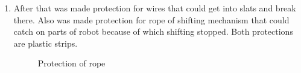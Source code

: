 \begin{enumerate}
  \item After that was made protection for wires that could get into slats and break there. Also was made protection for rope of shifting mechanism that could catch on parts of robot because of which shifting stopped. Both protections are plastic strips.
  
 \begin{figure}[H]
  \begin{minipage}[h]{0.49\linewidth}
  	\caption{Protection of rope}
  \end{minipage} 
  \begin{minipage}[h]{0.49\linewidth}

\end{minipage}
\end{figure}
\end{enumerate}
